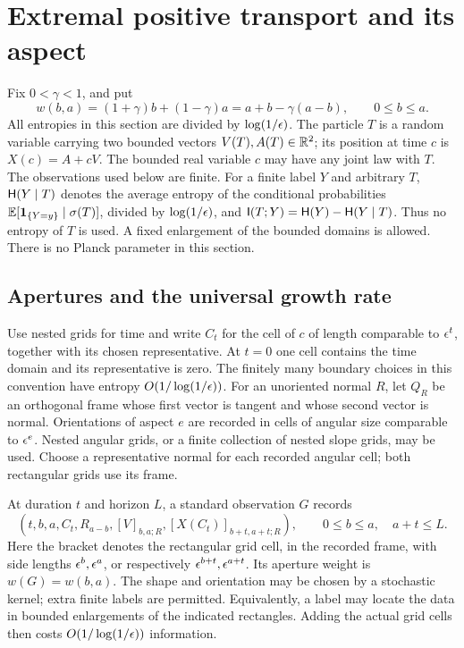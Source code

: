 \section{Extremal positive transport and its aspect}
\label{sec:classical-extremality}

Fix $0<\gamma<1$, and put
\[
 w(b,a)=(1+\gamma)b+(1-\gamma)a
       =a+b-\gamma(a-b),\qquad 0\le b\le a.
\]
All entropies in this section are divided by $\log(1/\epsilon)$.
The particle $T$ is a random variable carrying two bounded vectors
$V(T),A(T)\in\mathbb R^2$; its position at time $c$ is $X(c)=A+cV$.
The bounded real variable $c$ may have any joint law with $T$.
The observations used below are finite.  For a finite label $Y$ and
arbitrary $T$, $\mathsf H(Y\mid T)$ denotes the average entropy of the
conditional probabilities $\mathbb E[\mathbf 1_{\{Y=y\}}\mid\sigma(T)]$, divided
by $\log(1/\epsilon)$, and $\mathsf I(T;Y)=\mathsf H(Y)-\mathsf H(Y\mid T)$.  Thus no entropy
of $T$ is used.  A fixed enlargement of the bounded domains is allowed.
There is no Planck parameter in this section.

\subsection{Apertures and the universal growth rate}

Use nested grids for time and write $C_t$ for the cell of $c$ of length
comparable to $\epsilon^t$, together with its chosen representative.  At $t=0$
one cell contains the time domain and its representative is zero.  The
finitely many boundary choices in this convention have entropy
$O(1/\log(1/\epsilon))$.  For an unoriented normal $R$, let $Q_R$ be an
orthogonal frame whose first vector is tangent and whose second vector is
normal.  Orientations of aspect $e$ are recorded in cells of angular size
comparable to $\epsilon^e$.  Nested angular grids, or a finite collection of
nested slope grids, may be used.  Choose a representative normal for each
recorded angular cell; both rectangular grids use its frame.

\begin{definition}
\label{def:classical-aperture}
At duration $t$ and horizon $L$, a standard observation $G$ records
\[
 (t,b,a,C_t,R_{a-b},[V]_{b,a;R},
                   [X(C_t)]_{b+t,a+t;R}),
 \qquad 0\le b\le a,\quad a+t\le L.
\]
Here the bracket denotes the rectangular grid cell, in the recorded
frame, with side lengths $\epsilon^b,\epsilon^a$, or respectively
$\epsilon^{b+t},\epsilon^{a+t}$.  Its aperture weight is $w(G)=w(b,a)$.
The shape and orientation may be chosen by a stochastic kernel; extra
finite labels are permitted.  Equivalently, a label may locate the data
in bounded enlargements of the indicated rectangles.  Adding the actual
grid cells then costs $O(1/\log(1/\epsilon))$ information.
\end{definition}

